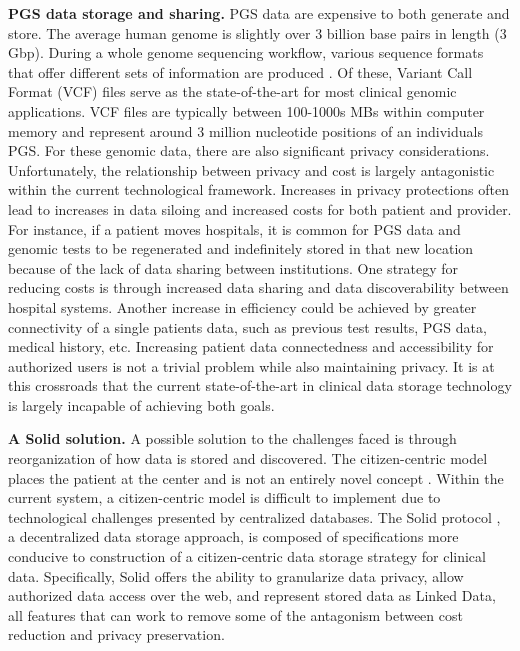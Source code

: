 \documentclass[runningheads]{llncs}
\begin{document}
\textbf{PGS data storage and sharing.} 
PGS data are expensive to both generate and store. 
The average human genome is slightly over 3 billion base pairs in length (3 Gbp). 
During a whole genome sequencing workflow, various sequence formats that offer different sets of information are produced \cite{bagger_whole_2024}.
Of these, Variant Call Format (VCF) files \cite{danecek_variant_2011} serve as the state-of-the-art for most clinical genomic applications.
VCF files are typically between 100-1000s MBs within computer memory and represent around 3 million nucleotide positions of an individual\textquotesingle s PGS.
For these genomic data, there are also significant privacy considerations.
Unfortunately, the relationship between privacy and cost is largely antagonistic within the current technological framework.
Increases in privacy protections often lead to increases in data siloing and increased costs for both patient and provider.
For instance, if a patient moves hospitals, it is common for PGS data and genomic tests to be regenerated and indefinitely stored in that new location because of the lack of data sharing between institutions.
One strategy for reducing costs is through increased data sharing and data discoverability between hospital systems.
Another increase in efficiency could be achieved by greater connectivity of a single patient\textquotesingle s data, such as previous test results, PGS data, medical history, etc.
Increasing patient data connectedness and accessibility for authorized users is not a trivial problem while also maintaining privacy.
It is at this crossroads that the current state-of-the-art in clinical data storage technology is largely incapable of achieving both goals.

\textbf{A Solid solution.} 
A possible solution to the challenges faced is through reorganization of how data is stored and discovered. 
The citizen-centric model places the patient at the center and is not an entirely novel concept \cite{brands_patient-centered_2022}.
Within the current system, a citizen-centric model is difficult to implement due to technological challenges presented by centralized databases.
The Solid protocol \cite{capadisli_solid_nodate}, a decentralized data storage approach, is composed of specifications more conducive to construction of a citizen-centric data storage strategy for clinical data.
Specifically, Solid offers the ability to granularize data privacy, allow authorized data access over the web, and represent stored data as Linked Data, all features that can work to remove some of the antagonism between cost reduction and privacy preservation.
\end{document}
